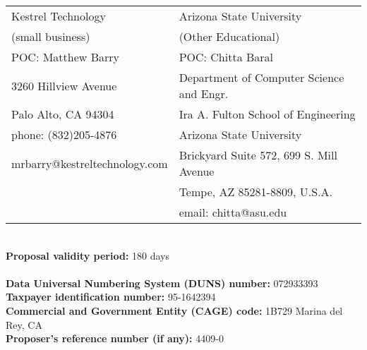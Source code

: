 \begin{tabularx}{\linewidth}{XX}
Kestrel Technology  & Arizona State University \\
(small business) & (Other Educational)\\
POC: Matthew Barry & POC: Chitta Baral\\
3260 Hillview Avenue & Department of Computer Science and Engr. \\
Palo Alto, CA 94304 & Ira A. Fulton School of Engineering \\ 
phone: (832)205-4876 & Arizona State University\\ 
mrbarry@kestreltechnology.com & Brickyard Suite 572, 699 S. Mill Avenue \\
& Tempe, AZ 85281-8809, U.S.A.\\
& email: chitta@asu.edu\\
\end{tabularx}
\\
\textbf{Proposal validity period: } 180 days\\
\\
\textbf{Data Universal Numbering System (DUNS) number: } 072933393\\
\textbf{Taxpayer identification number:} 95-1642394\\
\textbf{Commercial and Government Entity (CAGE) code:} 1B729 Marina del Rey, CA\\
\textbf{Proposer’s reference number (if any):}  4409-0\\